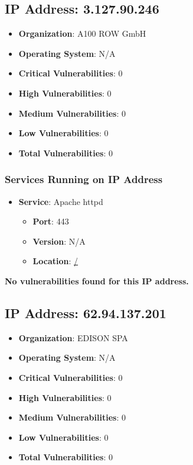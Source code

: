 \documentclass{article}
\begin{document}
\clearpage



\subsection{IP Address: 3.127.90.246}

\begin{itemize}
    \item \textbf{Organization}: A100 ROW GmbH
    \item \textbf{Operating System}:  N/A 
    \item \textbf{Critical Vulnerabilities}: 0
    \item \textbf{High Vulnerabilities}: 0
    \item \textbf{Medium Vulnerabilities}: 0
    \item \textbf{Low Vulnerabilities}: 0
    \item \textbf{Total Vulnerabilities}: 0
\end{itemize}

\subsubsection*{Services Running on IP Address}

\begin{itemize}
    
        \item \textbf{Service}: Apache httpd
        \begin{itemize}
            \item \textbf{Port}: 443
            \item \textbf{Version}:  N/A 
            \item \textbf{Location}: \href{ / }{ / }
        \end{itemize}
    
\end{itemize}


\textbf{No vulnerabilities found for this IP address.}




\clearpage



\subsection{IP Address: 62.94.137.201}

\begin{itemize}
    \item \textbf{Organization}: EDISON SPA
    \item \textbf{Operating System}:  N/A 
    \item \textbf{Critical Vulnerabilities}: 0
    \item \textbf{High Vulnerabilities}: 0
    \item \textbf{Medium Vulnerabilities}: 0
    \item \textbf{Low Vulnerabilities}: 0
    \item \textbf{Total Vulnerabilities}: 0
\end{itemize}
\end{document}
